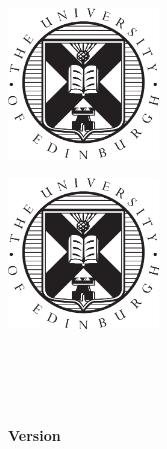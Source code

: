\makeatletter
\begin{titlepage}
\ifdefined\@school
        \begin{minipage}{0.6\textwidth}
        \begin{flushleft}
                { \Huge  \linespread{1.15} \@school \par}
        \end{flushleft}
        \end{minipage}\hfill
        \begin{minipage}{0.3\textwidth}
                \includegraphics[width=40mm,height=40mm]{Includes/crest.eps}
        \end{minipage}
\else
{\centering \includegraphics[width=40mm,height=40mm]{Includes/crest.eps}\\}
\fi
\vspace*{\fill}

{\centering
\ifdefined\@coursecode
{\LARGE\rmfamily\scshape \@coursecode\\}
\fi
{\Huge{} \@title\\}
\vspace{\fill}
{\Large \@author \\[1ex] \LARGE\bfseries \@date \ifdefined\@version \\[2ex] \large Version \@version\fi\\}
}
\end{titlepage}
\makeatother
